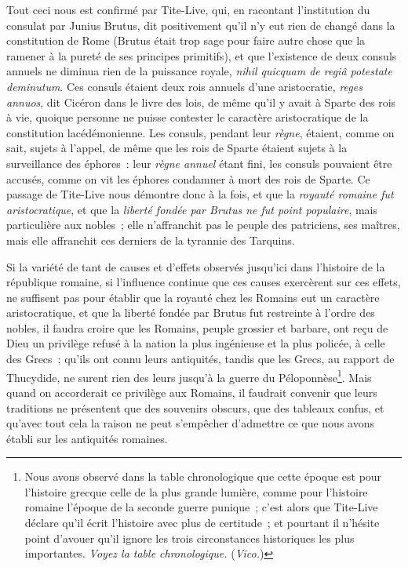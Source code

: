 \documentclass[french,twoside]{book} %
\begin{document}
Tout ceci nous est confirmé par Tite-Live, qui, en racontant l’institution du consulat par Junius Brutus, dit positivement qu’il n’y eut rien de changé dans la constitution de Rome (Brutus était trop sage pour faire autre chose que la ramener à la pureté de ses principes primitifs), et que l’existence de deux consuls annuels ne diminua rien de la puissance  royale, \emph{{\itshape nihil quicquam de regiâ potestate deminutum}}. Ces consuls étaient deux rois annuels d’une aristocratie, \emph{{\itshape reges annuos}}, dit Cicéron dans le livre des lois, de même qu’il y avait à Sparte des rois à vie, quoique personne ne puisse contester le caractère aristocratique de la constitution lacédémonienne. Les consuls, pendant leur {\itshape règne}, étaient, comme on sait, sujets à l’appel, de même que les rois de Sparte étaient sujets à la surveillance des éphores : leur {\itshape règne annuel} étant fini, les consuls pouvaient être accusés, comme on vit les éphores condamner à mort des rois de Sparte. Ce passage de Tite-Live nous démontre donc à la fois, et que la {\itshape royauté romaine fut aristocratique}, et que la {\itshape liberté fondée par Brutus ne fut point populaire}, mais particulière aux nobles ; elle n’affranchit pas le peuple des patriciens, ses maîtres, mais elle affranchit ces derniers de la tyrannie des Tarquins.\par
Si la variété de tant de causes et d’effets observés jusqu’ici dans l’histoire de la république romaine, si l’influence continue que ces causes exercèrent sur ces effets, ne suffisent pas pour établir que la royauté chez les Romains eut un caractère aristocratique, et que la liberté fondée par Brutus fut restreinte à l’ordre des nobles, il faudra croire que les Romains, peuple grossier et barbare, ont reçu de Dieu un privilège refusé à la nation la plus ingénieuse et la plus policée, à celle des Grecs ; qu’ils ont connu leurs antiquités, tandis que les Grecs, au rapport de Thucydide, ne surent rien des  leurs jusqu’à la guerre du Péloponnèse\footnote{Nous avons observé dans la table chronologique que cette époque est pour l’histoire grecque celle de la plus grande lumière, comme pour l’histoire romaine l’époque de la seconde guerre punique ; c’est alors que Tite-Live déclare qu’il écrit l’histoire avec plus de certitude ; et pourtant il n’hésite point d’avouer qu’il ignore les trois circonstances historiques les plus importantes. {\itshape Voyez la table chronologique.} ({\itshape Vico.})}. Mais quand on accorderait ce privilège aux Romains, il faudrait convenir que leurs traditions ne présentent que des souvenirs obscurs, que des tableaux confus, et qu’avec tout cela la raison ne peut s’empêcher d’admettre ce que nous avons établi sur les antiquités romaines.
\end{document}
